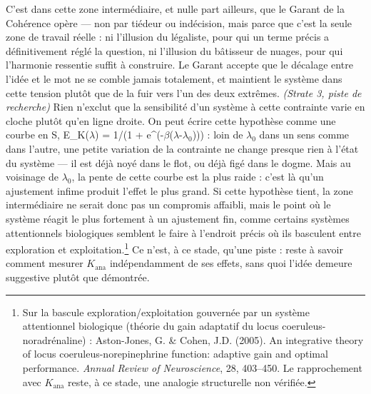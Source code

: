\documentclass[french, 11pt, twoside, openright, a5paper]{book}
\begin{document}
C'est dans cette zone intermédiaire, et nulle part ailleurs, que le
Garant de la Cohérence opère --- non par tiédeur ou indécision, mais
parce que c'est la seule zone de travail réelle : ni l'illusion du
légaliste, pour qui un terme précis a définitivement réglé la question,
ni l'illusion du bâtisseur de nuages, pour qui l'harmonie ressentie
suffit à construire. Le Garant accepte que le décalage entre l'idée et
le mot ne se comble jamais totalement, et maintient le système dans
cette tension plutôt que de la fuir vers l'un des deux extrêmes.
\emph{(Strate 3, piste de recherche)} Rien n'exclut que la sensibilité
d'un système à cette contrainte varie en cloche plutôt qu'en ligne
droite. On peut écrire cette hypothèse comme une courbe en S, E\_K($\lambda$) =
1/(1 + e\^{}(-$\beta$($\lambda$-$\lambda_0$))) : loin de $\lambda_0$ dans un sens comme dans l'autre,
une petite variation de la contrainte ne change presque rien à l'état du
système --- il est déjà noyé dans le flot, ou déjà figé dans le dogme.
Mais au voisinage de $\lambda_0$, la pente de cette courbe est la plus raide :
c'est là qu'un ajustement infime produit l'effet le plus grand. Si cette
hypothèse tient, la zone intermédiaire ne serait donc pas un compromis
affaibli, mais le point où le système réagit le plus fortement à un
ajustement fin, comme certains systèmes attentionnels biologiques
semblent le faire à l'endroit précis où ils basculent entre exploration
et exploitation.\footnote{Sur la bascule exploration/exploitation gouvernée par un système attentionnel biologique (théorie du gain adaptatif du locus coeruleus-noradrénaline) : Aston-Jones, G. \& Cohen, J.D. (2005). An integrative theory of locus coeruleus-norepinephrine function: adaptive gain and optimal performance. \emph{Annual Review of Neuroscience}, 28, 403--450. Le rapprochement avec $K_{\text{ana}}$ reste, à ce stade, une analogie structurelle non vérifiée.} Ce n'est, à ce stade, qu'une piste : reste à savoir
comment mesurer $K_{\text{ana}}$ indépendamment de ses effets, sans quoi l'idée
demeure suggestive plutôt que démontrée.
\end{document}
